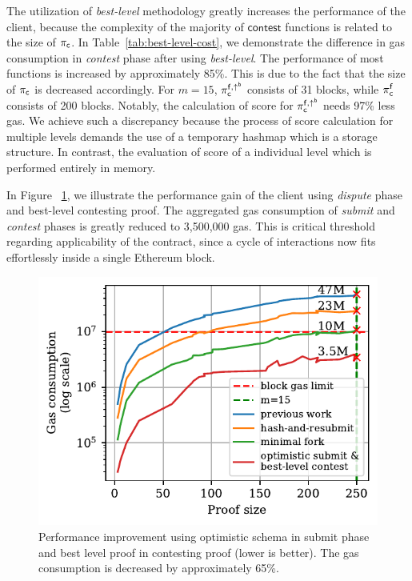 The utilization of \emph{best-level} methodology greatly increases the
performance of the client, because the complexity of the majority of
$\textsf{contest}$ functions is related to the size of $\mathsf{\pi_{c}}$. In
Table~\ref{tab:best-level-cost}, we demonstrate the difference in gas
consumption in \emph{contest} phase after using \emph{best-level}. The
performance of most functions is increased by approximately 85\%. This is due
to the fact that the size of $\mathsf{\pi_{c}}$ is decreased accordingly. For $m=15$,
$\mathsf{\pi_{c}^{f, \uparrow^{b}}}$ consists of 31 blocks, while $\mathsf{\pi_{c}^{f}}$ consists of 200 blocks.
Notably, the calculation of score for $\mathsf{\pi_{c}^{f, \uparrow^{b}}}$ needs 97\% less gas. We achieve
such a discrepancy because the process of score calculation for multiple levels
demands the use of a temporary hashmap which is a storage structure. In
contrast, the evaluation of score of a individual level which is performed
entirely in memory.



In Figure ~\ref{fig:dispute-best-level}, we illustrate the performance gain of
the client using \emph{dispute} phase and best-level contesting proof. The
aggregated gas consumption of \emph{submit} and \emph{contest} phases is
greatly reduced to 3,500,000 gas. This is critical threshold regarding
applicability of the contract, since a cycle of interactions now fits
effortlessly inside a single Ethereum block.



\begin{figure}[!h]
    \begin{center}
        \includegraphics[width=1\columnwidth]{figures/dispute-best-level.pdf}
    \end{center}
    \caption{Performance improvement using optimistic schema in submit phase
        and best level proof in contesting proof (lower is better). The gas
        consumption is decreased by approximately 65\%.}
    \label{fig:dispute-best-level}
\end{figure}
